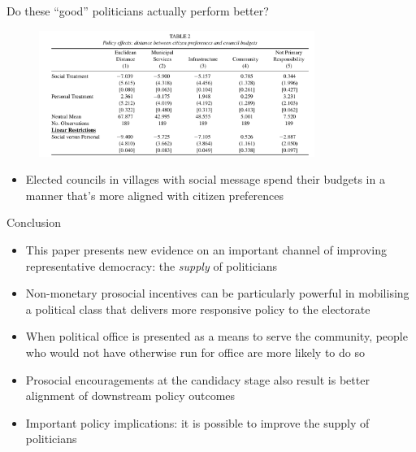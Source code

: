\documentclass[11pt,notes=hide,aspectratio=169,mathserif]{beamer}
\begin{document}
\begin{frame}{Do these ``good'' politicians actually perform better?}
    \begin{figure}
        \centering
        \includegraphics[width=0.8\textwidth]{inputs/table2.png}
        \end{figure}
\begin{itemize}
\item Elected councils in villages with social message spend their budgets in a manner that's more aligned with citizen preferences
\end{itemize}
\end{frame}

\begin{frame}{Conclusion}
\begin{itemize}
\item This paper presents new evidence on an important channel of improving representative democracy: the \textit{supply} of politicians
\item Non-monetary prosocial incentives can be particularly powerful in mobilising a political class that delivers more responsive policy to the electorate
\item When political office is presented as a means to serve the community, people who would not have otherwise run for office are more likely to do so
\item Prosocial encouragements at the candidacy stage also result is better alignment of downstream policy outcomes
\item Important policy implications: it is possible to improve the supply of politicians
\end{itemize}
\end{frame}
\end{document}
